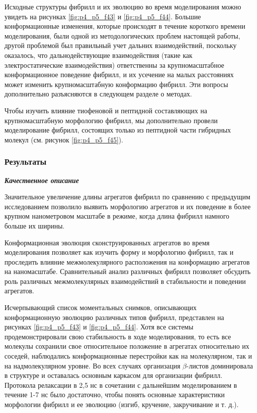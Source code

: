     Исходные структуры фибрилл и их эволюцию во время моделирования можно увидеть на рисунках \ref{fig:p4_p5_f43} и \ref{fig:p4_p5_f44}. Большие конформационные изменения, которые происходят в течение короткого времени моделирования, были одной из методологических проблем настоящей работы, другой проблемой был правильный учет дальних взаимодействий, поскольку оказалось, что дальнодействующие взаимодействия (такие как электростатические взаимодействия) ответственны за крупномасштабное конформационное поведение фибрилл, и их усечение на малых расстояниях может изменить крупномасштабную конформацию фибрилл. Эти вопросы дополнительно разъясняются в следующем разделе о методах.

    Чтобы изучить влияние тиофеновой и пептидной составляющих на крупномасштабную морфологию фибрилл, мы дополнительно провели моделирование фибрилл, состоящих только из пептидной части гибридных молекул (см. рисунок \ref{fig:p4_p5_f45}).

\subsubsection{Результаты}

    \emph{\textbf{Качественное описание}}

    Значительное увеличение длины агрегатов фибрилл по сравнению с предыдущим исследованием позволило выявить морфологию агрегатов и их поведение в более крупном нанометровом масштабе в режиме, когда длина фибрилл намного больше их ширины.

    Конформационная эволюция сконструированных агрегатов во время моделирования позволяет как изучить форму и морфологию фибрилл, так и проследить влияние межмолекулярного расположения на конформацию агрегатов на наномасштабе. Сравнительный анализ различных фибрилл позволяет обсудить роль различных межмолекулярных взаимодействий в стабильности и поведении агрегатов.

    Исчерпывающий список моментальных снимков, описывающих конформационную эволюцию различных типов фибрилл, представлен на рисунках \ref{fig:p4_p5_f43} и \ref{fig:p4_p5_f44}. Хотя все системы продемонстрировали свою стабильность в ходе моделирования, то есть все молекулы сохранили свое относительное положение в агрегатах относительно их соседей, наблюдались конформационные перестройки как на молекулярном, так и на надмолекулярном уровне. Во всех случаях организация $\beta$-листов доминировала в структуре и оставалась основным каркасом для организации фибрилл. Протокола релаксации в 2,5 нс в сочетании с дальнейшим моделированием в течение 1-7 нс было достаточно, чтобы понять основные характеристики морфологии фибрилл и ее эволюцию (изгиб, кручение, закручивание и т. д.).
    
